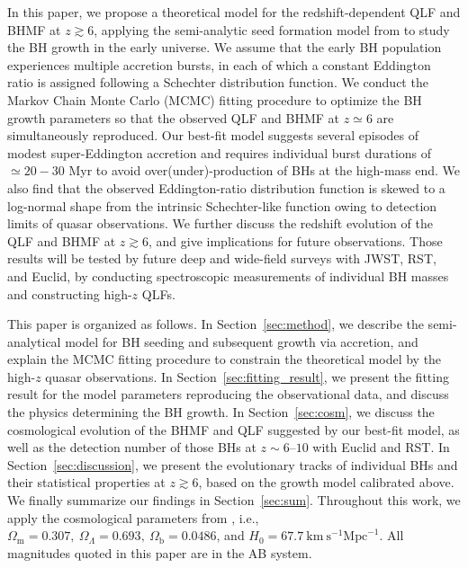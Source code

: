 \documentclass[twocolumn, twocolappendix]{aastex63}
\begin{document}
\begin{CJK*}{UTF8}{gbsn}
In this paper, we propose a theoretical model for the redshift-dependent QLF and BHMF at $z\gtrsim 6$,
applying the semi-analytic seed formation model from \cite{2021ApJ...917...60L} to study the BH growth in the early universe.
We assume that the early BH population experiences multiple accretion bursts, in each of which a constant Eddington ratio is assigned 
following a Schechter distribution function. 
We conduct the Markov Chain Monte Carlo (MCMC) fitting procedure to optimize the BH growth parameters 
so that the observed QLF and BHMF at $z\simeq 6$ are simultaneously reproduced. 
Our best-fit model suggests several episodes of modest super-Eddington accretion and requires
individual burst durations of $\simeq 20-30$ Myr to avoid over(under)-production of BHs at the high-mass end.
We also find that the observed Eddington-ratio distribution function is skewed to a log-normal shape from the intrinsic Schechter-like function
owing to detection limits of quasar observations.
We further discuss the redshift evolution of the QLF and BHMF at $z\gtrsim 6$,
and give implications for future observations.
Those results will be tested by future deep and wide-field surveys with JWST, RST, and Euclid,
by conducting spectroscopic measurements of individual BH masses and constructing high-$z$ QLFs.  



This paper is organized as follows. 
In Section~\ref{sec:method}, we describe the semi-analytical model for BH seeding and subsequent growth via accretion,
and explain the MCMC fitting procedure to constrain the theoretical model by the high-$z$ quasar observations.
In Section~\ref{sec:fitting_result}, we present the fitting result for the model parameters reproducing the observational data,
and discuss the physics determining the BH growth.
In Section~\ref{sec:cosm}, we discuss the cosmological evolution of the BHMF and QLF suggested by our best-fit model,
as well as the detection number of those BHs at $z\sim 6$--$10$ with Euclid and RST.
In Section~\ref{sec:discussion}, we present the evolutionary tracks of individual BHs and their statistical properties at $z\gtrsim 6$,
based on the growth model calibrated above.
We finally summarize our findings in Section~\ref{sec:sum}.
Throughout this work, we apply the cosmological parameters from \cite{2016A&A...594A..13P},
i.e., $\Omega_{\mathrm{m}}=0.307,~\Omega_{\Lambda}=0.693,~
\Omega_{\mathrm{b}}=0.0486$, and $H_0=67.7 \mathrm{~km} \mathrm{~s}^{-1} \mathrm{Mpc}^{-1}$.
All magnitudes quoted in this paper are in the AB system.




\end{CJK*}
\end{document}
